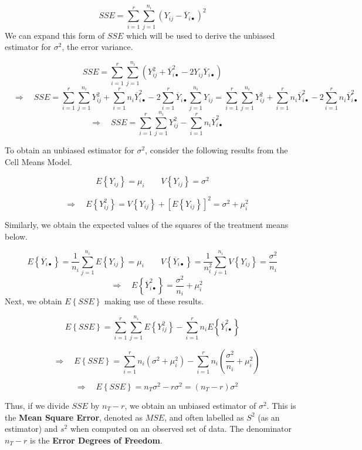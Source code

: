 \documentclass[
]{book}
\begin{document}
\[
SSE=\sum_{i=1}^r\sum_{j=1}^{n_i} \left(Y_{ij}-\overline{Y}_{i\bullet}\right)^2
\] We can expand this form of \(SSE\) which will be used to derive the
unbiased estimator for \(\sigma^2\), the error variance.

\[
SSE=\sum_{i=1}^r\sum_{j=1}^{n_i}\left(
Y_{ij}^2 + \overline{Y}_{i\bullet}^2 - 
2Y_{ij}\overline{Y}_{i\bullet}\right)
\] \[
\quad \Rightarrow \quad
SSE = \sum_{i=1}^r\sum_{j=1}^{n_i} Y_{ij}^2
+ \sum_{i=1}^r n_i\overline{Y}_{i\bullet}^2
-2\sum_{i=1}^r\overline{Y}_{i\bullet}\sum_{j=1}^{n_i} Y_{ij}=
\sum_{i=1}^r\sum_{j=1}^{n_i} Y_{ij}^2
+ \sum_{i=1}^r n_i\overline{Y}_{i\bullet}^2
-2\sum_{i=1}^r  n_i\overline{Y}_{i\bullet}^2
\] \[
\quad \Rightarrow \quad 
SSE =\sum_{i=1}^r\sum_{j=1}^{n_i} Y_{ij}^2 -
\sum_{i=1}^r n_i\overline{Y}_{i\bullet}^2
\]

To obtain an unbiased estimator for \(\sigma^2\), consider the following
results from the Cell Means Model.

\[
E\left\{Y_{ij}\right\}=\mu_i 
\qquad
V\left\{Y_{ij}\right\}= \sigma^2 
\]

\[
\quad \Rightarrow \quad
E\left\{Y_{ij}^2\right\} = 
V\left\{Y_{ij}\right\} + 
\left[E\left\{Y_{ij}\right\}\right]^2
=
\sigma^2 + \mu_i^2
\]

Similarly, we obtain the expected values of the squares of the treatment
means below.

\[
E\left\{\overline{Y}_{i\bullet}\right\}
=\frac{1}{n_i}\sum_{j=1}^{n_i}E\left\{Y_{ij}\right\}
=\mu_i
\qquad 
V\left\{\overline{Y}_{i\bullet}\right\}
=\frac{1}{n_i^2}\sum_{j=1}^{n_i}V\left\{Y_{ij}\right\}
=\frac{\sigma^2}{n_i}
\] \[
\quad \Rightarrow \quad
E\left\{\overline{Y}_{i\bullet}^2\right\}=
\frac{\sigma^2}{n_i} + \mu_i^2
\] Next, we obtain \(E\left\{SSE\right\}\) making use of these results.

\[
E\left\{SSE\right\} =
\sum_{i=1}^r\sum_{j=1}^{n_i} E\left\{Y_{ij}^2\right\} -
\sum_{i=1}^r n_iE\left\{\overline{Y}_{i\bullet}^2\right\}
\]

\[
\quad \Rightarrow \quad
E\left\{SSE\right\} =
\sum_{i=1}^r n_i\left(\sigma^2 + \mu_i^2\right)
- \sum_{i=1}^r n_i\left(\frac{\sigma^2}{n_i} + \mu_i^2\right)
\]

\[
\quad \Rightarrow \quad
E\left\{SSE\right\} 
=n_T\sigma^2 - r\sigma^2 = \left(n_T-r\right)\sigma^2
\]

Thus, if we divide \(SSE\) by \(n_T-r\), we obtain an unbiased estimator
of \(\sigma^2\). This is the \textbf{Mean Square Error}, denoted as
\(MSE\), and often labelled as \(S^2\) (as an estimator) and \(s^2\)
when computed on an observed set of data. The denominator \(n_T-r\) is
the \textbf{Error Degrees of Freedom}.
\end{document}
